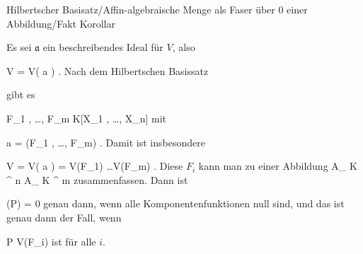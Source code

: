 {Hilbertscher Basisatz/Affin-algebraische Menge als Faser über 0 einer Abbildung/Fakt}
{Korollar}
{}
{



\faktsituation {}
\faktzusatz {}
\faktzusatz {}




}
{




Es sei ${\mathfrak a}$ ein beschreibendes Ideal für $V$, also

\mavergleichskette
{\vergleichskette
{V
}
{ = }{ V( {\mathfrak a} )
}
{  }{
}
{    }{
}
{   }{
}
}
{}{}{.}
Nach
dem
Hilbertschen Basissatz

gibt es

\mavergleichskette
{\vergleichskette
{ F_1 , \ldots ,  F_m
}
{ \in }{ K[X_1 , \ldots , X_n]
}
{  }{
}
{    }{
}
{   }{
}
}
{}{}{}
mit

\mavergleichskette
{\vergleichskette
{ {\mathfrak a}
}
{ = }{ (F_1 , \ldots , F_m)
}
{  }{
}
{    }{
}
{   }{
}
}
{}{}{.}
Damit ist insbesondere

\mavergleichskettedisp
{\vergleichskette
{V
}
{ =} { V( {\mathfrak a} )
}
{ =} { V(F_1) \cap \ldots \cap V(F_m)
}
{ } {
}
{ } {
}
}
{}{}{.}
Diese $F_i$ kann man zu einer Abbildung
 { { {\mathbb A}_{  K }^{  n   } }  } { { {\mathbb A}_{  K }^{  m   } }
} {}
zusammenfassen. Dann ist

\mavergleichskette
{\vergleichskette
{ \varphi(P)
}
{ = }{ 0
}
{  }{
}
{    }{
}
{   }{
}
}
{}{}{}
genau dann, wenn alle Komponentenfunktionen null sind, und das ist genau dann der Fall, wenn

\mavergleichskette
{\vergleichskette
{ P
}
{ \in }{ V(F_i)
}
{  }{
}
{    }{
}
{   }{
}
}
{}{}{}
ist für alle $i$.




}







